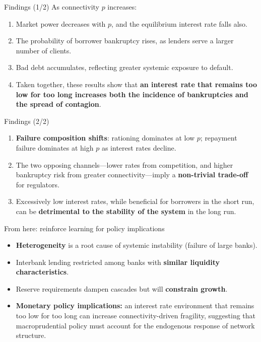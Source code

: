 \begin{frame}{Findings (1/2)}
  As connectivity $p$ increases:
  \begin{enumerate}
    \item Market power decreases with $p$, and the equilibrium interest rate falls also.
    \item The probability of borrower bankruptcy rises, as lenders serve a larger number of clients.
    \item Bad debt accumulates, reflecting greater systemic exposure to default.
    \item Taken together, these results show that \textbf{an interest rate that remains too low for too long increases both the incidence of bankruptcies and the spread of contagion}.
  \end{enumerate}
\end{frame}

\begin{frame}{Findings (2/2)}
  \begin{enumerate}
    \item \textbf{Failure composition shifts}: rationing dominates at low $p$; repayment failure dominates at high $p$ as interest rates decline.
    \item The two opposing channels---lower rates from competition, and higher bankruptcy risk from greater connectivity---imply a \textbf{non-trivial trade-off} for regulators.
    \item Excessively low interest rates, while beneficial for borrowers in the short run, can be \textbf{detrimental to the stability of the system} in the long run.
  \end{enumerate}
\end{frame}

\begin{frame}{From here: reinforce learning for policy implications}
  \begin{itemize}
    \item \textbf{Heterogeneity} is a root cause of systemic instability (failure of large banks).
    \item Interbank lending restricted among banks with \textbf{similar liquidity characteristics}.
    \item Reserve requirements dampen cascades but will \textbf{constrain growth}.
    \item \textbf{Monetary policy implications:} an interest rate environment that remains too low for too long can increase connectivity-driven fragility, suggesting that macroprudential policy must account for the endogenous response of network structure.
  \end{itemize}
\end{frame}


